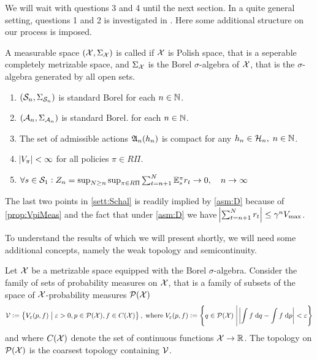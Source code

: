 We will wait with questions 3 and 4 until the next section.
In a quite general setting, questions 1 and 2
is investigated in .
Here some additional structure on our process is imposed.

\begin{defn}
  A measurable space $(\mathcal{X}, \Sigma_\mathcal{X})$ is called
   if $\mathcal{X}$ is Polish space, that is a
  seperable completely metrizable space, and $\Sigma_\mathcal{X}$ is
  the Borel $\sigma$-algebra of $\mathcal{X}$, that is the $\sigma$-algebra
  generated by all open sets.
  \label{defn:standardBorelp}
\end{defn}

\begin{sett}[Schäl]
  \leavevmode
  \begin{enumerate}
    \item $(\mathcal{S}_n, \Sigma_{\mathcal{S}_n})$ is standard Borel
      for each $n \in \mathbb{N}$.
    \item $(\mathcal{A}_n, \Sigma_{\mathcal{A}_n})$ is standard Borel.
      for each $n \in \mathbb{N}$.
    \item The set of admissible actions
      $\frak{A}_n(h_n)$ is compact for any $h_n \in \mathcal{H}_n, \; n \in \mathbb{N}$.
    \item $\abs{V_\pi} < \infty$ for all policies $\pi \in R\Pi$.
    \item 
      $ \forall s \in \mathcal{S}_1 :
	Z_n = \sup_{N \geq n} \sup_{\pi \in R\Pi} \sum_{t=n+1}^N
      \mathbb{E}_s^\pi r_t \to 0, \quad n \to \infty $
  \end{enumerate}
  \label{sett:Schal}
\end{sett}
\begin{rem}
  The last two points in \cref{sett:Schal} is readily implied by
  \cref{asm:D} because of \cref{prop:VpiMeas} and the fact that under
  \cref{asm:D} we have
  $\abs{\sum_{t=n+1}^N r_t} \leq \gamma^n V_{\max}$.
\end{rem}

To understand the results of  which we will present shortly,
we will need some additional concepts, namely the weak topology and
semicontinuity.

\begin{defn}
  Let $\mathcal{X}$ be a metrizable space equipped with the Borel $\sigma$-algebra.
  Consider the family of sets of probability measures on $\mathcal{X}$,
  that is a family of subsets of the space of $\mathcal{X}$-probability measures
  $\mathcal{P}(\mathcal{X})$
  \[ \mathcal{V} \vcentcolon= \left\{ V_\varepsilon(p, f) \;\middle\vert\; \varepsilon > 0, p \in \mathcal{P}(\mathcal{X}),
    f \in C(\mathcal{X}) \right\}, \; \mathrm{where} \;
    V_\varepsilon(p, f) \vcentcolon= \left\{ q \in \mathcal{P}(\mathcal{X}) \;\middle\vert\;
  \abs{\int f \; \mathrm{d} q - \int f \; \mathrm{d} p} < \varepsilon \right\} \]
  and where $C(\mathcal{X})$ denote the set of continuous functions $\mathcal{X} \to \mathbb{R}$.
  The  topology on $\mathcal{P}(\mathcal{X})$ is the coarsest topology
  containing $\mathcal{V}$.
  \label{defn:weakTop}
\end{defn}

